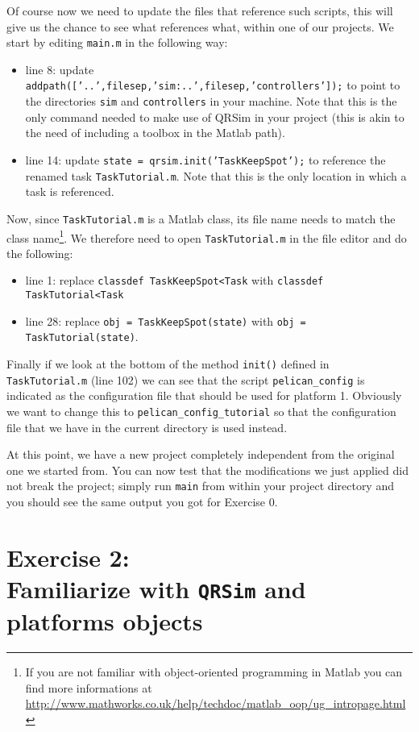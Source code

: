\documentclass[a4paper,11pt]{article}
\begin{document}
Of course now we need to update the files that reference such scripts, this will give us the chance to see what references what, within one of our projects.
We start by editing \texttt{main.m} in the following way:
\begin{itemize}
 \item line 8: update \texttt{addpath(['..',filesep,'sim:..',filesep,'controllers']);} to point to the directories \texttt{sim} and \texttt{controllers} in your machine. Note that this is the only command needed to make use of QRSim in your project (this is akin to the need of including a toolbox in the Matlab path).
 \item line 14: update \texttt{state = qrsim.init('TaskKeepSpot');} to reference the renamed task \texttt{TaskTutorial.m}. Note that this is the only location in which a task is referenced.
\end{itemize}  
Now, since \texttt{TaskTutorial.m} is a Matlab class, its file name needs to match the class name\footnote{If you are not familiar with object-oriented programming in Matlab you can find more informations at \url{http://www.mathworks.co.uk/help/techdoc/matlab_oop/ug_intropage.html}}. We therefore need to open \texttt{TaskTutorial.m} in the file editor and do the following:
\begin{itemize}
 \item line 1: replace \texttt{classdef TaskKeepSpot<Task} with \texttt{classdef TaskTutorial<Task}
 \item line 28: replace \texttt{obj = TaskKeepSpot(state)} with \texttt{obj = TaskTutorial(state)}.
\end{itemize}
Finally if we look at the bottom of the method \texttt{init()} defined in \texttt{TaskTutorial.m} (line 102) we can see that the script \texttt{pelican\_config} is indicated as the configuration file that should be used for platform 1. Obviously we want to change this to \texttt{pelican\_config\_tutorial} so that the configuration file that we have in the current directory is used instead.

At this point, we have a new project completely independent from the original one we started from. You can now test that the modifications we just applied did not break the project; simply run \texttt{main} from within your project directory and you should see the same output you got for Exercise 0. 


\section*{Exercise 2:\\Familiarize with \texttt{QRSim} and platforms objects}
\end{document}
